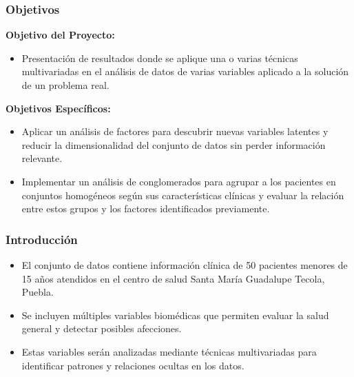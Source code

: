 
\begin{frame}
    \frametitle{Objetivos} %
    \textbf{Objetivo del Proyecto:}
    \begin{itemize}
        \item Presentación de resultados donde se aplique una o varias técnicas multivariadas en el análisis de datos de varias variables aplicado a la solución de un problema real.
    \end{itemize}

    \vspace{0.5cm}

    \textbf{Objetivos Específicos:}
    \begin{itemize}
        \item Aplicar un análisis de factores para descubrir nuevas variables latentes y reducir la dimensionalidad del conjunto de datos sin perder información relevante.
        \item Implementar un análisis de conglomerados para agrupar a los pacientes en conjuntos homogéneos según sus características clínicas y evaluar la relación entre estos grupos y los factores identificados previamente.
    \end{itemize}
\end{frame}


\begin{frame}
    \frametitle{Introducción} %
    \begin{itemize}
        \item El conjunto de datos contiene información clínica de 50 pacientes menores de 15 años atendidos en el centro de salud Santa María Guadalupe Tecola, Puebla.
        \item Se incluyen múltiples variables biomédicas que permiten evaluar la salud general y detectar posibles afecciones.
        \item Estas variables serán analizadas mediante técnicas multivariadas para identificar patrones y relaciones ocultas en los datos.
    \end{itemize}
\end{frame}

